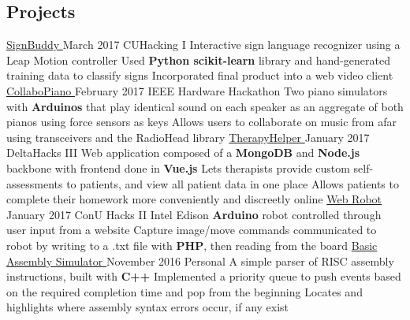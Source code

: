 \documentclass[]{aanguyen_res}
\begin{document}
\begin{main}
		\section{Projects}
			\mainentry%
				{\href{http://github.com/aanguyen/SignBuddy}{SignBuddy {\faGithub}}}%
				{March 2017}%
				{CUHacking I}%
				{}%
				{\faCaretRight Interactive sign language recognizer using a Leap Motion controller 
				\faCaretRight Used \textbf{Python scikit-learn} library and hand-generated training data to classify signs
				\faCaretRight Incorporated final product into a web video client}
			\vspace{0.1cm}%
			\mainentry%
				{\href{http://github.com/aanguyen/collaboPiano}{CollaboPiano {\faGithub}}}%
				{February 2017}%
				{IEEE Hardware Hackathon}%
				{}%
				{\faCaretRight Two piano simulators with \textbf{Arduinos} that play identical sound on each speaker as an aggregate of both pianos using force sensors as keys
				\faCaretRight Allows users to collaborate on music from afar using transceivers and the RadioHead library}
			\vspace{0.1cm}%
			\mainentry%
				{\href{http://github.com/dtong1113/TherapyHelper}{TherapyHelper {\faGithub}}}%
				{January 2017}%
				{DeltaHacks III}%
				{}%
				{\faCaretRight Web application composed of a \textbf{MongoDB} and \textbf{Node.js} backbone with frontend done in \textbf{Vue.js}
				\faCaretRight Lets therapists provide custom self-assessments to patients, and view all patient data in one place
				\faCaretRight Allows patients to complete their homework more conveniently and discreetly online}
			\vspace{0.1cm}%
			\mainentry%
				{\href{http://github.com/Havkiin/RobotRock}{Web Robot {\faGithub}}}%
				{January 2017}%
				{ConU Hacks II}%
				{}%
				{\faCaretRight Intel Edison \textbf{Arduino} robot controlled through user input from a website
				\faCaretRight Capture image/move commands communicated to robot by writing to a .txt file with \textbf{PHP}, then reading from the board}%
			\vspace{0.1cm}%
			\mainentry%
				{\href{http://github.com/aanguyen/assembly-parser}{Basic Assembly Simulator {\faGithub}}}%
				{November 2016}%
				{Personal}%
				{}%
				{\faCaretRight A simple parser of RISC assembly instructions, built with \textbf{C++}
				\faCaretRight Implemented a priority queue to push events based on the required completion time and pop from the beginning
				\faCaretRight Locates and highlights where assembly syntax errors occur, if any exist}

\end{main}
\end{document}
